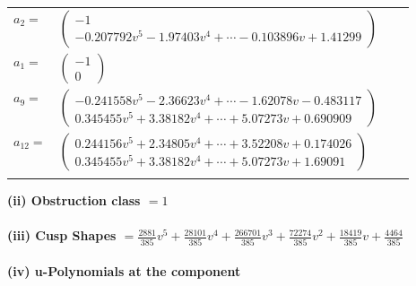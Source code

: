 \documentclass[1p]{elsarticle_modified}
\theoremstyle{definition}
\begin{document}
\begin{tabular}{m{7pt} m{180pt} m{7pt} m{180pt} }
\flushright $a_{2}=$&$\begin{pmatrix}-1\\-0.207792 v^{5}-1.97403 v^{4}+\cdots-0.103896 v+1.41299\end{pmatrix}$ \\
\flushright $a_{1}=$&$\begin{pmatrix}-1\\0\end{pmatrix}$ \\
\flushright $a_{9}=$&$\begin{pmatrix}-0.241558 v^{5}-2.36623 v^{4}+\cdots-1.62078 v-0.483117\\0.345455 v^{5}+3.38182 v^{4}+\cdots+5.07273 v+0.690909\end{pmatrix}$ \\
\flushright $a_{12}=$&$\begin{pmatrix}0.244156 v^{5}+2.34805 v^{4}+\cdots+3.52208 v+0.174026\\0.345455 v^{5}+3.38182 v^{4}+\cdots+5.07273 v+1.69091\end{pmatrix}$\\&\end{tabular}
\flushleft \textbf{(ii) Obstruction class $= 1$}\\~\\
\flushleft \textbf{(iii) Cusp Shapes $= \frac{2881}{385} v^5+\frac{28101}{385} v^4+\frac{266701}{385} v^3+\frac{72274}{385} v^2+\frac{18419}{385} v+\frac{4464}{385}$}\\~\\
\newpage\renewcommand{\arraystretch}{1}
\flushleft \textbf{(iv) u-Polynomials at the component}\newline \\
\end{document}
